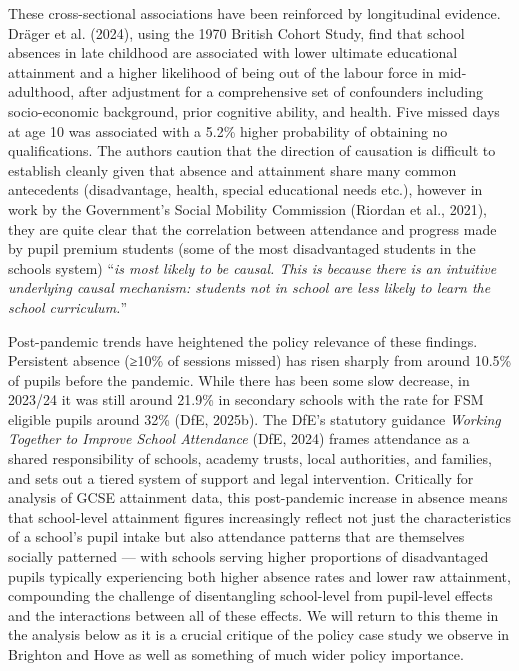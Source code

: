 \documentclass[
  11pt,
]{article}
\begin{document}
These cross-sectional associations have been reinforced by longitudinal
evidence. Dräger et al. (2024), using the 1970 British Cohort Study,
find that school absences in late childhood are associated with lower
ultimate educational attainment and a higher likelihood of being out of
the labour force in mid-adulthood, after adjustment for a comprehensive
set of confounders including socio-economic background, prior cognitive
ability, and health. Five missed days at age 10 was associated with a
5.2\% higher probability of obtaining no qualifications. The authors
caution that the direction of causation is difficult to establish
cleanly given that absence and attainment share many common antecedents
(disadvantage, health, special educational needs etc.), however in work
by the Government's Social Mobility Commission (Riordan et al., 2021),
they are quite clear that the correlation between attendance and
progress made by pupil premium students (some of the most disadvantaged
students in the schools system) ``\emph{is most likely to be causal.
This is because there is an intuitive underlying causal mechanism:
students not in school are less likely to learn the school
curriculum.}''

Post-pandemic trends have heightened the policy relevance of these
findings. Persistent absence (≥10\% of sessions missed) has risen
sharply from around 10.5\% of pupils before the pandemic. While there
has been some slow decrease, in 2023/24 it was still around 21.9\% in
secondary schools with the rate for FSM eligible pupils around 32\%
(DfE, 2025b). The DfE's statutory guidance \emph{Working Together to
Improve School Attendance} (DfE, 2024) frames attendance as a shared
responsibility of schools, academy trusts, local authorities, and
families, and sets out a tiered system of support and legal
intervention. Critically for analysis of GCSE attainment data, this
post-pandemic increase in absence means that school-level attainment
figures increasingly reflect not just the characteristics of a school's
pupil intake but also attendance patterns that are themselves socially
patterned --- with schools serving higher proportions of disadvantaged
pupils typically experiencing both higher absence rates and lower raw
attainment, compounding the challenge of disentangling school-level from
pupil-level effects and the interactions between all of these effects.
We will return to this theme in the analysis below as it is a crucial
critique of the policy case study we observe in Brighton and Hove as
well as something of much wider policy importance.
\end{document}
